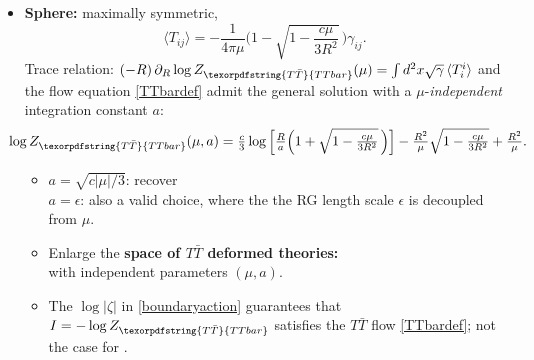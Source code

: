 \documentclass[10pt]{article}
\newcommand{\citations}[1]{{\footnotesize#1\par}}
\newcommand{\TTbar}{\texorpdfstring{\ensuremath{T\bar{T}}}{TTbar}\xspace}
\begin{document}
\begin{multicols}{3}
\begin{itemize}
\item \textbf{Sphere:} maximally symmetric,\\ \mbox{\footnotesize \textcite{Donnelly:2018bef}}
	\begin{equation}
		\langle T_{ij}\rangle = -\frac{1}{4\pi\mu} \bigg(1-\sqrt{1-\frac{c\mu}{3R^2}}\, \bigg)  \gamma_{ij}.
	\end{equation}
Trace relation: \mbox{$
(-R)\,\partial_R \log Z_{\TTbar}(\mu)=\int d^2x\sqrt{\gamma}\,\langle T^i_i \rangle
$} and the flow equation \eqref{TTbardef} 
admit the general \mbox{solution} with a $\mu$-\textit{independent} integration constant $a$:
	\begin{equation*}\small
	\hspace{-1.3em}
		\log Z_{\TTbar}(\mu, a) = \tfrac{c}{3} \log \Big[\tfrac{R}{a}   \Big(1+\sqrt{1-\tfrac{c \mu }{3  R^2}}\, \Big) \Big] - \tfrac{R^2}{\mu}  \sqrt{1-\tfrac{c \mu }{3 R^2}} + \tfrac{R^2}{\mu}. %
	\end{equation*}
	\begin{itemize}%
	\item $a = \sqrt{c|\mu|/3}$: \mbox{recover {\footnotesize \textcite{Donnelly:2018bef}}} \\
	$a = \epsilon$: also a valid choice, where the the RG length scale $\epsilon$ is decoupled from $\mu$.
	
	\item Enlarge the \textbf{space of \TTbar deformed theories:}\\
	with \mbox{independent} parameters $(\mu,a)$.
	
	\item The $\log |\zeta|$ in \eqref{boundaryaction} guarantees that $I = -\log Z_{\TTbar}$ \mbox{satisfies} the $T\bar T$ flow \eqref{TTbardef}; not the case for \cite{Donnelly:2018bef}.
	\end{itemize}

	
	\begin{flushright}
		\vspace{-.6\baselineskip}
		\citations{
			\textcite{Caputa:2020lpa}\\
			\textcite{Li:2020zjb}
		}\vspace{-.8\baselineskip}
	\end{flushright}
	

\end{itemize}
\end{multicols}
\end{document}
